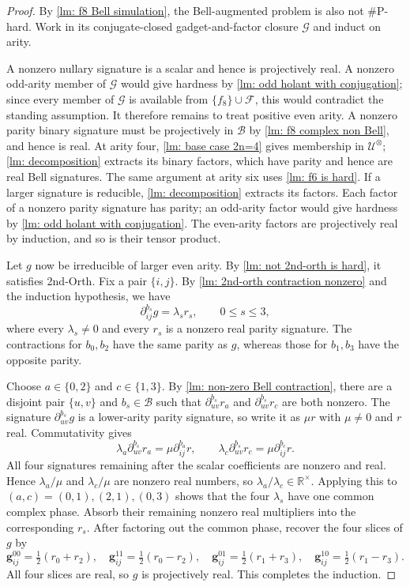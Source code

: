 \begin{proof}
By \cref{lm: f8 Bell simulation}, the Bell-augmented problem is also not
\#P-hard.  Work in its conjugate-closed gadget-and-factor closure
$\mathcal G$ and induct on arity.

A nonzero nullary signature is a scalar and hence is projectively real.
A nonzero odd-arity member of $\mathcal G$ would give hardness by
\cref{lm: odd holant with conjugation}; since every member of $\mathcal G$
is available from $\{f_8\}\cup\mathcal F$, this would contradict the
standing assumption.  It therefore remains to treat positive even arity.
A nonzero parity binary signature must be projectively in $\mathcal B$ by
\cref{lm: f8 complex non Bell}, and hence is real.  At arity four,
\cref{lm: base case 2n=4} gives membership in
$\mathcal U^{\otimes}$; \cref{lm: decomposition} extracts its binary
factors, which have parity and hence are real Bell signatures.  The same
argument at arity six uses \cref{lm: f6 is hard}.  If a larger signature
is reducible, \cref{lm: decomposition} extracts its factors.  Each factor
of a nonzero parity signature has parity; an odd-arity factor would give
hardness by \cref{lm: odd holant with conjugation}.  The even-arity factors
are projectively real by induction, and so is their tensor product.

Let $g$ now be irreducible of larger even arity.  By
\cref{lm: not 2nd-orth is hard}, it satisfies {\sc 2nd-Orth}.  Fix a pair
$\{i,j\}$.  By \cref{lm: 2nd-orth contraction nonzero} and the
induction hypothesis, we have
\begin{equation}
 \partial_{ij}^{b_s}g=\lambda_s r_s,
 \qquad 0\leq s\leq3,
 \label{eq: projectively real Bell contractions}
\end{equation}
where every $\lambda_s\neq0$ and every $r_s$ is a nonzero real parity
signature.  The contractions for $b_0,b_2$ have the same parity as $g$,
whereas those for $b_1,b_3$ have the opposite parity.

Choose $a\in\{0,2\}$ and $c\in\{1,3\}$.  By
\cref{lm: non-zero Bell contraction}, there are a disjoint pair
$\{u,v\}$ and $b_s\in\mathcal B$ such that
$\partial_{uv}^{b_s}r_a$ and $\partial_{uv}^{b_s}r_c$ are both nonzero.
The signature $\partial_{uv}^{b_s}g$ is a lower-arity parity signature, so
write it as $\mu r$ with $\mu\neq0$ and $r$ real.  Commutativity gives
\[
 \lambda_a\partial_{uv}^{b_s}r_a
 =\mu\partial_{ij}^{b_a}r,\qquad
 \lambda_c\partial_{uv}^{b_s}r_c
 =\mu\partial_{ij}^{b_c}r.
\]
All four signatures remaining after the scalar coefficients are nonzero
and real.  Hence $\lambda_a/\mu$ and $\lambda_c/\mu$ are nonzero real
numbers, so $\lambda_a/\lambda_c\in\mathbb R^\times$.  Applying this to
$(a,c)=(0,1),(2,1),(0,3)$ shows that the four $\lambda_s$ have one common
complex phase.  Absorb their remaining nonzero real multipliers into the
corresponding $r_s$.  After factoring out the common phase, recover the
four slices of $g$ by
\[
 \mathbf g_{ij}^{00}=\tfrac12(r_0+r_2),\quad
 \mathbf g_{ij}^{11}=\tfrac12(r_0-r_2),\quad
 \mathbf g_{ij}^{01}=\tfrac12(r_1+r_3),\quad
 \mathbf g_{ij}^{10}=\tfrac12(r_1-r_3).
\]
All four slices are real, so $g$ is projectively real.  This completes the
induction.
\end{proof}

